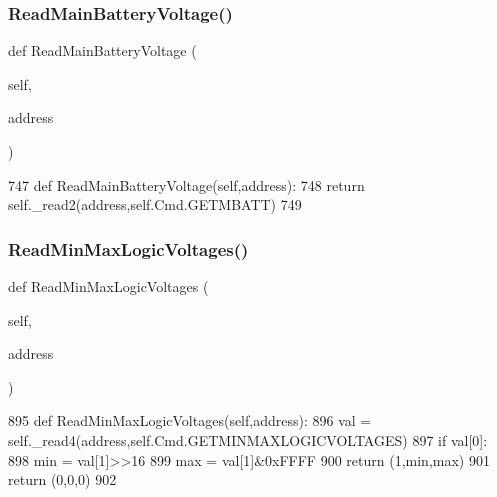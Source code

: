 \subsubsection{\texorpdfstring{Read\+Main\+Battery\+Voltage()}{ReadMainBatteryVoltage()}}
{\footnotesize\ttfamily def Read\+Main\+Battery\+Voltage (\begin{DoxyParamCaption}\item[{}]{self,  }\item[{}]{address }\end{DoxyParamCaption})}


\begin{DoxyCode}
747     \textcolor{keyword}{def }ReadMainBatteryVoltage(self,address):
748         \textcolor{keywordflow}{return} self.\_read2(address,self.Cmd.GETMBATT)
749 
\end{DoxyCode}
\mbox{\label{classtoxic__hardware_1_1roboclaw__3_1_1Roboclaw_a6b08f6579fda6d73bc23b5ebe628f952}} 
\subsubsection{\texorpdfstring{Read\+Min\+Max\+Logic\+Voltages()}{ReadMinMaxLogicVoltages()}}
{\footnotesize\ttfamily def Read\+Min\+Max\+Logic\+Voltages (\begin{DoxyParamCaption}\item[{}]{self,  }\item[{}]{address }\end{DoxyParamCaption})}


\begin{DoxyCode}
895     \textcolor{keyword}{def }ReadMinMaxLogicVoltages(self,address):
896         val = self.\_read4(address,self.Cmd.GETMINMAXLOGICVOLTAGES)
897         \textcolor{keywordflow}{if} val[0]:
898             min = val[1]>>16
899             max = val[1]&0xFFFF
900             \textcolor{keywordflow}{return} (1,min,max)
901         \textcolor{keywordflow}{return} (0,0,0)
902 
\end{DoxyCode}
\mbox{\label{classtoxic__hardware_1_1roboclaw__3_1_1Roboclaw_a5ca4a184f6501b75d547c6bdcbf3735f}} 

